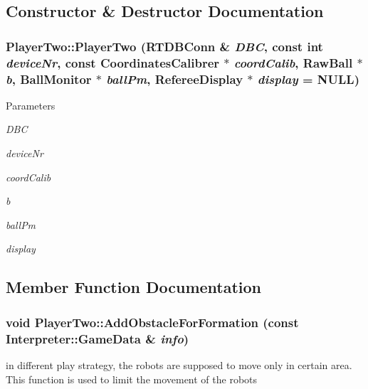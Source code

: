 \subsection{Constructor \& Destructor Documentation}
\hypertarget{classPlayerTwo_ac69719e70c78f7dffa36300f833955b1}{
\subsubsection[{PlayerTwo}]{\setlength{\rightskip}{0pt plus 5cm}PlayerTwo::PlayerTwo (RTDBConn \& {\em DBC}, \/  const int {\em deviceNr}, \/  const {\bf CoordinatesCalibrer} $\ast$ {\em coordCalib}, \/  RawBall $\ast$ {\em b}, \/  {\bf BallMonitor} $\ast$ {\em ballPm}, \/  {\bf RefereeDisplay} $\ast$ {\em display} = {\ttfamily NULL})}}
\label{classPlayerTwo_ac69719e70c78f7dffa36300f833955b1}

\begin{DoxyParams}{Parameters}
\item[{\em DBC}]\item[{\em deviceNr}]\item[{\em coordCalib}]\item[{\em b}]\item[{\em ballPm}]\item[{\em display}]\end{DoxyParams}


\subsection{Member Function Documentation}
\hypertarget{classPlayerTwo_a9e3341541658f54a2dfb0491a774b4d4}{
\subsubsection[{AddObstacleForFormation}]{\setlength{\rightskip}{0pt plus 5cm}void PlayerTwo::AddObstacleForFormation (const {\bf Interpreter::GameData} \& {\em info})}}
\label{classPlayerTwo_a9e3341541658f54a2dfb0491a774b4d4}


in different play strategy, the robots are supposed to move only in certain area. This function is used to limit the movement of the robots 


